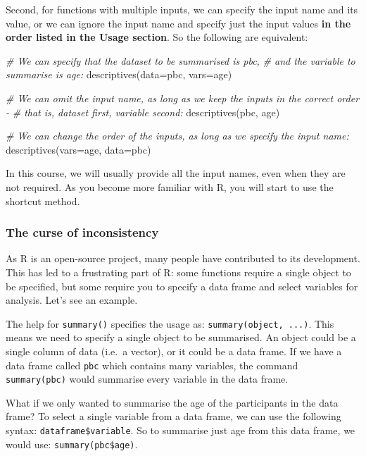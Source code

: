 \documentclass[
  a4paper,
]{memoir}
\newenvironment{Shaded}{\begin{snugshade}}{\end{snugshade}}
\newcommand{\AttributeTok}[1]{\textcolor[rgb]{0.00,0.00,0.00}{#1}}
\newcommand{\CommentTok}[1]{\textcolor[rgb]{0.00,0.00,0.00}{\textit{#1}}}
\newcommand{\FunctionTok}[1]{\textcolor[rgb]{0.00,0.00,0.00}{#1}}
\newcommand{\NormalTok}[1]{\textcolor[rgb]{0.00,0.00,0.00}{#1}}
\begin{document}
Second, for functions with multiple inputs, we can specify the input
name and its value, or we can ignore the input name and specify just the
input values \textbf{in the order listed in the Usage section}. So the
following are equivalent:

\begin{Shaded}
\begin{Highlighting}[]
\CommentTok{\# We can specify that the dataset to be summarised is pbc,}
\CommentTok{\#   and the variable to summarise is age:}
\FunctionTok{descriptives}\NormalTok{(}\AttributeTok{data=}\NormalTok{pbc, }\AttributeTok{vars=}\NormalTok{age)}

\CommentTok{\# We can omit the input name, as long as we keep the inputs in the correct order {-} }
\CommentTok{\#   that is, dataset first, variable second:}
\FunctionTok{descriptives}\NormalTok{(pbc, age)}

\CommentTok{\# We can change the order of the inputs, as long as we specify the input name:}
\FunctionTok{descriptives}\NormalTok{(}\AttributeTok{vars=}\NormalTok{age, }\AttributeTok{data=}\NormalTok{pbc)}
\end{Highlighting}
\end{Shaded}

In this course, we will usually provide all the input names, even when
they are not required. As you become more familiar with R, you will
start to use the shortcut method.

\hypertarget{the-curse-of-inconsistency}{%
\subsubsection{The curse of
inconsistency}\label{the-curse-of-inconsistency}}

As R is an open-source project, many people have contributed to its
development. This has led to a frustrating part of R: some functions
require a single object to be specified, but some require you to specify
a data frame and select variables for analysis. Let's see an example.

The help for \texttt{summary()} specifies the usage as:
\texttt{summary(object,\ ...)}. This means we need to specify a single
object to be summarised. An object could be a single column of data
(i.e.~a vector), or it could be a data frame. If we have a data frame
called \texttt{pbc} which contains many variables, the command
\texttt{summary(pbc)} would summarise every variable in the data frame.

What if we only wanted to summarise the age of the participants in the
data frame? To select a single variable from a data frame, we can use
the following syntax: \texttt{dataframe\$variable}. So to summarise just
age from this data frame, we would use: \texttt{summary(pbc\$age)}.
\end{document}
